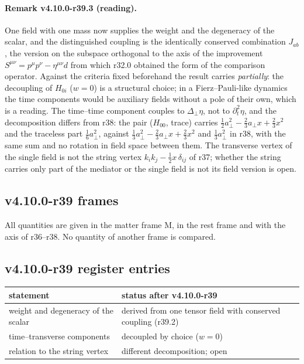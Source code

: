 \paragraph{Remark v4.10.0-r39.3 (reading).}
One field with one mass now supplies the weight and the degeneracy of the scalar, and the distinguished coupling is the identically conserved
combination \(J_{ab}\), the version on the subspace orthogonal to the axis of the improvement \(S^{\mu\nu}=p^\mu p^\nu-\eta^{\mu\nu}d\) from which r32.0
obtained the form of the comparison operator.  Against the criteria fixed beforehand the result carries \emph{partially}: the decoupling of
\(H_{0i}\) (\(w=0\)) is a structural choice; in a Fierz--Pauli-like dynamics the time components would be auxiliary fields without a pole of their own,
which is a reading.  The time--time component couples to \(\Delta_\perp\eta\), not to \(\partial_t^2\eta\), and the decomposition differs from r38: the pair
(\(H_{00}\), trace) carries \(\tfrac12a_\perp^2-\tfrac23a_\perp x+\tfrac23x^2\) and the traceless part \(\tfrac16a_\perp^2\), against \(\tfrac13a_\perp^2-\tfrac23a_\perp x+\tfrac23x^2\) and \(\tfrac13a_\perp^2\) in r38,
with the same sum and no rotation in field space between them.  The transverse vertex of the single field is not the string vertex
\(k_ik_j-\tfrac12x\,\delta_{ij}\) of r37; whether the string carries only part of the mediator or the single field is not its field version is open.

\subsection*{v4.10.0-r39 frames}
\label{subsec:v4100-r39-frames}

All quantities are given in the matter frame M, in the rest frame and with the axis of r36--r38.  No quantity of another frame is compared.

\subsection*{v4.10.0-r39 register entries}
\label{subsec:v4100-r39-register}

\begin{center}
\small
\begin{tabular}{@{}>{\raggedright\arraybackslash}p{}>{\raggedright\arraybackslash}p{}@{}}
\toprule
statement & status after v4.10.0-r39\\
\midrule
weight and degeneracy of the scalar & derived from one tensor field with conserved coupling (r39.2)\\
time--transverse components & decoupled by choice (\(w=0\))\\
relation to the string vertex & different decomposition; open\\
\bottomrule
\end{tabular}
\end{center}


